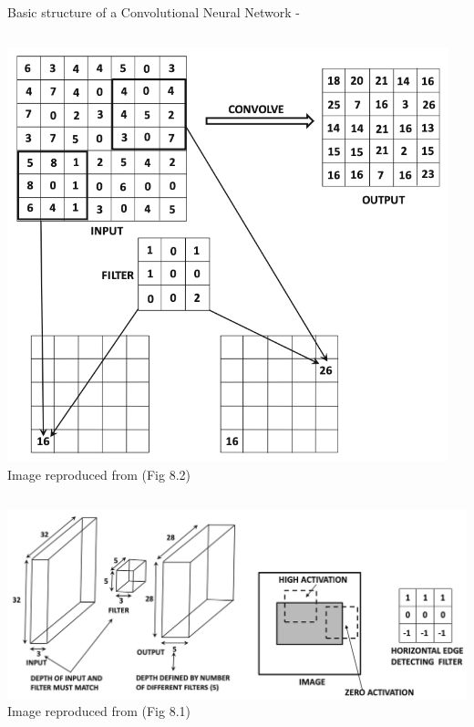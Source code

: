 \begin{frame}[t,allowframebreaks]{Basic structure of a Convolutional Neural Network -}
    \begin{columns}
        \begin{column}{0.60\textwidth}
            \begin{center}
                \includegraphics[width=1.00\textwidth]
                  {./images/cnn/convolution/aggarwal_convolution_illustration_1.png}\\
                {\scriptsize 
                  \color{col:attribution} 
                  Image reproduced from \cite{Aggarwal:2018SpringerDL} (Fig 8.2)}\\    
            \end{center}      
        \end{column}
        \begin{column}{0.40\textwidth}
            \vspace{0.0cm}
        \end{column}
    \end{columns}

    \framebreak

    \begin{center}
        \includegraphics[width=1.00\textwidth]
          {./images/cnn/convolution/aggarwal_convolution_illustration_2.png}\\
        {\scriptsize 
          \color{col:attribution} 
          Image reproduced from \cite{Aggarwal:2018SpringerDL} (Fig 8.1)}\\    
    \end{center}      


\end{frame}
